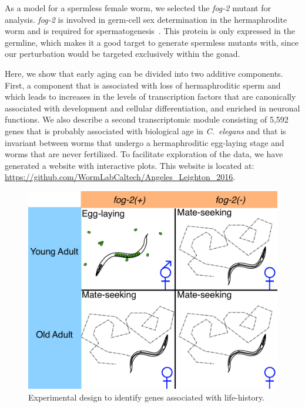 \documentclass[9pt,twocolumn,twoside]{gsag3jnl}
\newcommand{\cel}{\emph{C.~elegans}}
\newcommand{\fog}{\emph{fog-2}}
\newcommand{\agen}{5,592}
\begin{document}
As a model for a spermless female worm, we selected the \fog{} mutant for analysis. \fog{} is involved in germ-cell sex determination in the hermaphrodite worm and is required for spermatogenesis~\citep{Schedl1988,Clifford2000}. This protein is only expressed in the germline, which makes it a good target to generate spermless mutants with, since our perturbation would be targeted exclusively within the gonad.

Here, we show that early aging can be divided into two additive components. First, a component that is associated with loss of hermaphroditic sperm and which leads to increases in the levels of transcription factors that are canonically associated with development and cellular differentiation, and enriched in neuronal functions.
We also describe a second transcriptomic module consisting of \agen{} genes that is probably associated with biological age in \cel{} and that is invariant between worms that undergo a hermaphroditic egg-laying stage and worms that are never fertilized. To facilitate exploration of the data, we have generated a website with interactive plots. This website is located at: \url{https://github.com/WormLabCaltech/Angeles_Leighton_2016}.

\begin{figure}[htbp]
\renewcommand{\familydefault}{\sfdefault}\normalfont{}
\centering
\includegraphics[width=\linewidth]{../output/figs/final_figs/worm_life_fog2_vs_n2.pdf}
\caption{Experimental design to identify genes associated with life-history.
}%
\label{fig:wormlife}
\end{figure}
\end{document}
